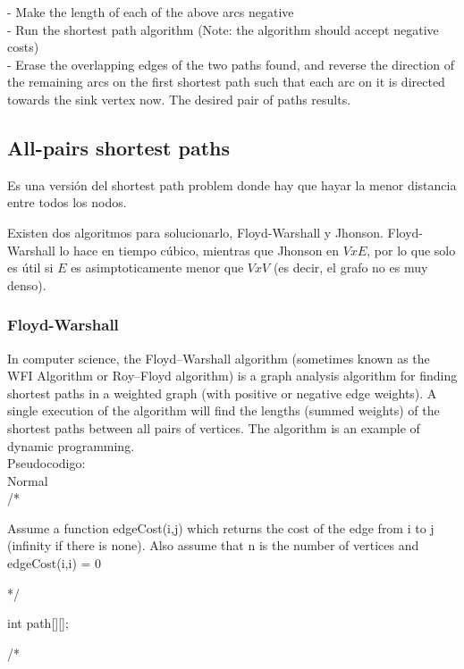 \documentclass[10pt,letterpaper,twocolumn,twosided]{article}
\begin{document}
- Make the length of each of the above arcs negative\\

- Run the shortest path algorithm (Note: the algorithm should accept negative costs)\\

- Erase the overlapping edges of the two paths found, and reverse the direction of the remaining arcs on the 
first shortest path such that each arc on it is directed towards the sink vertex now. The desired pair of 
paths results.\\


\subsection{All-pairs shortest paths}

Es una versión del shortest path problem donde hay que hayar la menor distancia entre todos los nodos.

Existen dos algoritmos para solucionarlo, Floyd-Warshall y Jhonson. Floyd-Warshall lo hace en tiempo cúbico, 
mientras que Jhonson en $V x E$, por lo que solo es útil si $E$ es asimptoticamente menor que $V x V$ (es decir,
el grafo no es muy denso).

\subsubsection{Floyd-Warshall}

In computer science, the Floyd–Warshall algorithm (sometimes known as the WFI Algorithm or Roy–Floyd algorithm)
is a graph analysis algorithm for finding shortest paths in a weighted graph (with positive or negative edge weights).
A single execution of the algorithm will find the lengths (summed weights) of the shortest paths between all pairs
of vertices. The algorithm is an example of dynamic programming.\\ 

Pseudocodigo:\\

Normal\\

/* 

    Assume a function edgeCost(i,j) which returns the cost of the edge from i to j
    (infinity if there is none).
    Also assume that n is the number of vertices and edgeCost(i,i) = 0

*/
 
 int path[][];

 /*
\end{document}
